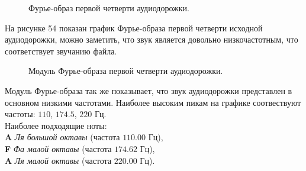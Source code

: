 \documentclass[a5paper, 10pt]{article}
\theoremstyle{definition}
\theoremstyle{plain}
\theoremstyle{remark}
\begin{document}
\begin{figure}[h!]
\caption{Фурье-образ первой четверти аудиодорожки.}
\end{figure}

\newpage
На рисунке 54 показан график Фурье-образа первой четверти исходной аудиодорожки, можно заметить, что звук является довольно низкочастотным,  что соответствует звучанию файла.

\begin{figure}[h!]
\caption{Модуль Фурье-образа первой четверти аудиодорожки.}
\end{figure}

\newpage
Модуль Фурье-образа так же показывает, что звук аудиодорожки представлен в основном низкими частотами. Наиболее высоким пикам на графике соотвествуют частоты: $110$, $174.5$, $220$ Гц. \\
Наиболее подходящие ноты:\\
 \textbf{A} \textit{Ля большой октавы} (частота $110.00$ Гц),\\
 \textbf{F} \textit{Фа малой октавы} (частота $174.62$ Гц),\\
 \textbf{A} \textit{Ля малой октавы} (частота $220.00$ Гц).
\end{document}
